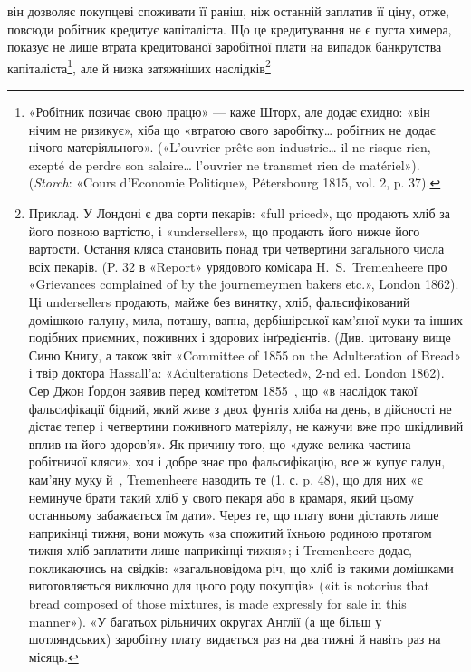 \parcont{}  %
він дозволяє покупцеві споживати її раніш, ніж останній заплатив
її ціну, отже, повсюди робітник кредитує капіталіста. Що це
кредитування не є пуста химера, показує не лише втрата кредитованої
заробітної плати на випадок банкрутства капіталіста\footnote{
«Робітник позичає свою працю» — каже Шторх, але додає єхидно:
«він нічим не ризикує», хіба що «втратою свого заробітку\dots{} робітник не
додає нічого матеріяльного». («L’ouvrier prête son industrie\dots{} il ne risque
rien, exepté de perdre son salaire\dots{} l’ouvrier ne transmet rien de matériel»).
(\emph{Storch}: «Cours d’Economie Politique», Pétersbourg 1815, vol. 2, p. 37).
},
але й низка затяжніших наслідків\footnote{
Приклад. У Лондоні є два сорти пекарів: «full priced», що продають
хліб за його повною вартістю, і «undersellers», що продають його
нижче його вартости. Остання кляса становить понад три четвертини
загального числа всіх пекарів. (P. 32 в «Report» урядового комісара
H.~S.~Tremenheere про «Grievances complained of by the journemeymen
bakers etc.», London 1862). Ці undersellers продають, майже без винятку,
хліб, фальсифікований домішкою галуну, мила, поташу, вапна, дербішірської
кам’яної муки та інших подібних приємних, поживних і здорових
інґредієнтів. (Див. цитовану вище Синю Книгу, а також звіт «Committee
of 1855 on the Adulteration of Bread» і твір доктора Hassall’a: «Adulterations
Detected», 2-nd ed. London 1862). Сер Джон Ґордон заявив
перед комітетом 1855~, що «в наслідок такої фальсифікації бідний, який
живе з двох фунтів хліба на день, в дійсності не дістає тепер і четвертини
поживного матеріялу, не кажучи вже про шкідливий вплив на його здоров’я».
Як причину того, що «дуже велика частина робітничої кляси»,
хоч і добре знає про фальсифікацію, все ж купує галун, кам’яну муку
й~, Tremenheere наводить те (1. с. p. 48), що для них «є неминуче
брати такий хліб у свого пекаря або в крамаря, який цьому останньому
забажається їм дати». Через те, що плату вони дістають лише наприкінці
тижня, вони можуть «за спожитий їхньою родиною протягом
тижня хліб заплатити лише наприкінці тижня»; і Tremenheere додає,
покликаючись на свідків: «загальновідома річ, що хліб із такими домішками
виготовляється виключно для цього роду покупців» («it is notorius
that bread composed of those mixtures, is made expressly for sale in this
manner»). «У багатьох рільничих округах Англії (а ще більш у шотляндських)
заробітну плату видається раз на два тижні й навіть раз на місяць.
}
